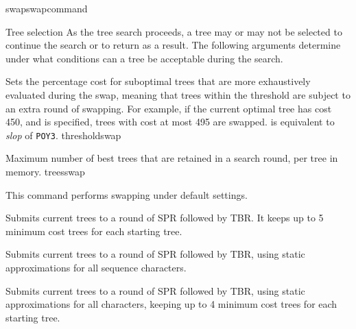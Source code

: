 \begin{command}{swap}{swapcommand}
\begin{arguments}
    \begin{argumentgroup}{Tree selection}
        {As the tree search proceeds, a tree may or may not be selected to
        continue the search or to return as a result. The following
        arguments determine under what conditions can a tree be acceptable
        during the search.}

            {Sets the percentage cost for suboptimal
            trees that are more exhaustively evaluated during the swap,
            meaning that trees within the threshold are subject to an extra
            round of swapping. For example, if the current
            optimal tree has cost 450, and  is specified, trees
            with cost at most 495 are swapped.   is
            equivalent to \emph{slop} of  \texttt{POY3}.}
            {thresholdswap}

            {Maximum number of best trees that are retained in a search round,
            per tree in memory.}
            {treesswap}

    \end{argumentgroup}
    
	\end{arguments}


	\begin{poyexamples} 
            {This command performs swapping under default settings.}

            {Submits current trees to a round of SPR followed by TBR. It keeps
            up to 5 minimum cost trees for each starting tree.}

            {Submits current trees to a round of SPR followed by TBR, using
            static approximations for all sequence characters.}
            
            {Submits current trees to a round of SPR followed by TBR, using
            static approximations for all characters, keeping up to 4 minimum
            cost trees for each starting tree.}
            

\end{poyexamples}
\end{command}
